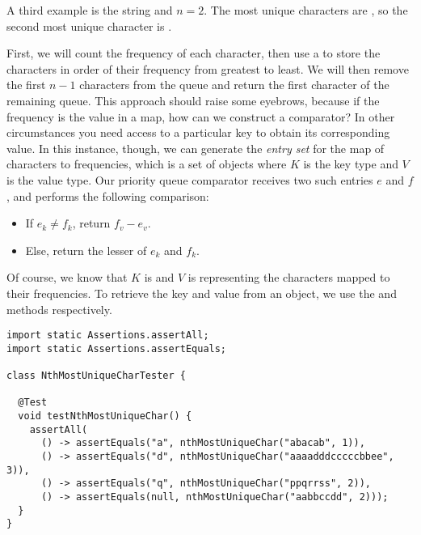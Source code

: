 A third example is the string  and $n=2$. The most unique characters are , so the second most unique character is .

First, we will count the frequency of each character, then use a  to store the characters in order of their frequency from greatest to least. We will then remove the first $n-1$ characters from the queue and return the first character of the remaining queue. This approach should raise some eyebrows, because if the frequency is the value in a map, how can we construct a comparator? In other circumstances you need access to a particular key to obtain its corresponding value. In this instance, though, we can generate the \emph{entry set} for the map of characters to frequencies, which is a set of  objects where $K$ is the key type and $V$ is the value type. Our priority queue comparator receives two such entries $e$ and $f$, and performs the following comparison:

\begin{itemize}
  \item If $e_k \neq f_k$, return $f_v - e_v$.
  \item Else, return the lesser of $e_k$ and $f_k$.
\end{itemize}


Of course, we know that $K$ is  and $V$ is  representing the characters mapped to their frequencies. To retrieve the key and value from an  object, we use the  and  methods respectively. 

\begin{lstlisting}[language=MyJava]
import static Assertions.assertAll;
import static Assertions.assertEquals;

class NthMostUniqueCharTester {

  @Test
  void testNthMostUniqueChar() {
    assertAll(
      () -> assertEquals("a", nthMostUniqueChar("abacab", 1)),
      () -> assertEquals("d", nthMostUniqueChar("aaaadddcccccbbee", 3)),
      () -> assertEquals("q", nthMostUniqueChar("ppqrrss", 2)),
      () -> assertEquals(null, nthMostUniqueChar("aabbccdd", 2)));
  }
}
\end{lstlisting}

